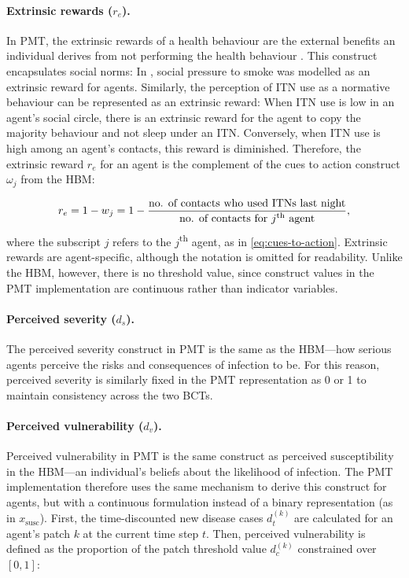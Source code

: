 \paragraph{Extrinsic rewards ($r_e$).}In PMT, the extrinsic rewards of a health behaviour are the external benefits an individual derives from not performing the health behaviour \cite{marikyan_protection_2023}. This construct encapsulates social norms: In \citet{kurchyna_seeing_2024}, social pressure to smoke was modelled as an extrinsic reward for agents. Similarly, the perception of ITN use as a normative behaviour can be represented as an extrinsic reward: When ITN use is low in an agent's social circle, there is an extrinsic reward for the agent to copy the majority behaviour and not sleep under an ITN. Conversely, when ITN use is high among an agent's contacts, this reward is diminished. Therefore, the extrinsic reward $r_e$ for an agent is the complement of the cues to action construct $\omega_j$ from the HBM:

\begin{equation}\label{eq:pmt-r-e}
    r_e=1-w_j=1-\frac{\text{no. of contacts who used ITNs last night}}{\text{no. of contacts for $j$\textsuperscript{th} agent}},
\end{equation}
where the subscript $j$ refers to the $j$\textsuperscript{th} agent, as in \eqref{eq:cues-to-action}. Extrinsic rewards are agent-specific, although the notation is omitted for readability. Unlike the HBM, however, there is no threshold value, since construct values in the PMT implementation are continuous rather than indicator variables.

\paragraph{Perceived severity ($d_s$).}The perceived severity construct in PMT is the same as the HBM---how serious agents perceive the risks and consequences of infection to be. For this reason, perceived severity is similarly fixed in the PMT representation as 0 or 1 to maintain consistency across the two BCTs.

\paragraph{Perceived vulnerability ($d_v$).}Perceived vulnerability in PMT is the same construct as perceived susceptibility in the HBM---an individual's beliefs about the likelihood of infection. The PMT implementation therefore uses the same mechanism to derive this construct for agents, but with a continuous formulation instead of a binary representation (as in $x_{\text{susc}}$). First, the time-discounted new disease cases $d_t^{(k)}$ are calculated for an agent's patch $k$ at the current time step $t$. Then, perceived vulnerability is defined as the proportion of the patch threshold value $d_c^{(k)}$ constrained over $[0,1]$:

